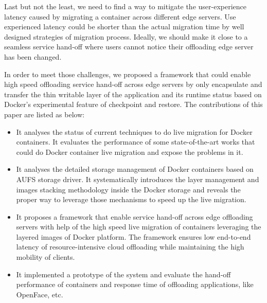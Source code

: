 Last but not the least, we need to find a way to mitigate the user-experience latency caused by migrating a container across different edge servers. Use experienced latency could be shorter than the actual migration time by well designed strategies of migration process. Ideally, we should make it close to a seamless service hand-off where users cannot notice their offloading edge server has been changed.

In order to meet those challenges, we proposed a framework that could enable high speed offloading service hand-off across edge servers by only encapsulate and transfer the thin writable layer of the application and its runtime status based on Docker's  experimental feature of checkpoint and restore. The contributions of this paper are listed as below:

\begin{itemize}
    
    \item It analyses the status of current techniques to do live migration for Docker containers. It evaluates the performance of some state-of-the-art works that could do Docker container live migration and expose the problems in it.
    
     \item It analyses the detailed storage management of Docker containers based on AUFS storage driver. It systematically introduces the layer management and images stacking methodology inside the Docker storage and reveals the proper way to leverage those mechanisms to speed up the live migration.
    
    
    \item It proposes a framework that enable service hand-off across edge offloading servers with help of the high speed live migration of containers leveraging the layered images of Docker platform. The framework ensures low end-to-end latency of resource-intensive cloud offloading while maintaining the high mobility of clients. 
    
    \item It implemented a prototype of the system and evaluate the hand-off performance of containers and response time of offloading applications, like OpenFace, etc. 
    
\end{itemize}
